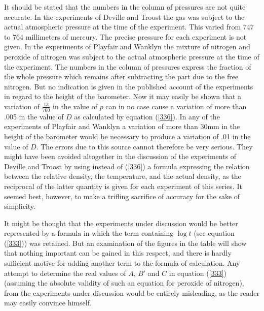 \documentclass[12pt]{article}
\begin{document}
It should be stated that the numbers in the column of pressures are not quite accurate.  In the experiments of Deville and Troost the gas was subject to the actual atmospheric pressure at the time of the experiment. This varied from 747 to 764 millimeters of mercury. The precise pressure for each experiment is not given. In the experiments of Playfair and Wanklyn the mixture of nitrogen and peroxide of nitrogen was subject to the actual atmospheric pressure at the time of the experiment. The numbers in the column of pressures express the fraction of the whole pressure which remains after subtracting the part due to the free nitrogen. But no indication is given in the published account of the experiments in regard to the height of the barometer. Now it may easily be shown that a variation of $\frac{13}{760}$ in the value of $p$ can in no case cause a variation of more than .005 in the value of $D$ as calculated by equation (\ref{336}). In any of the experiments of Playfair and Wanklyn a variation of more than 30mm in the height of the barometer would be necessary to produce a variation of .01 in the value of $D$. The errors due to this source cannot therefore be very serious. They might have been avoided altogether in the discussion of the experiments of Deville and Troost by using instead of (\ref{336}) a formula expressing the relation between the relative density, the temperature, and the actual density, as the reciprocal of the latter quantity is given for each experiment of this series. It seemed best, however, to make a trifling sacrifice of accuracy for the sake of simplicity.


It might be thought that the experiments under discussion would be better represented by a formula in which the term containing $\log t$ (see equation (\ref{333})) was retained. But an examination of the figures in the table will show that nothing important can be gained in this respect, and there is hardly sufficient motive for adding another term to the formula of calculation.  Any attempt to determine the real values of $A$, $B'$ and $C$ in equation (\ref{333}) (assuming the absolute validity of such an equation for peroxide of nitrogen), from the experiments under discussion would be entirely misleading, as the reader may easily convince himself.
\end{document}
